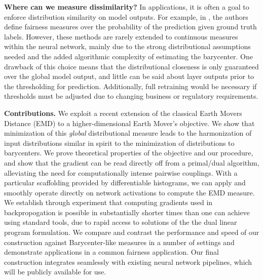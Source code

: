 \noindent\textbf{Where can we measure dissimilarity?}
In applications, it is often a goal to enforce distribution similarity on model outputs. For example, in \cite{jiang2020wasserstein}, the authors define fairness measures over the probability of the prediction given ground truth labels.   
% 
However, these methods are rarely extended to continuous measures within the neural network, 
mainly due to the strong distributional assumptions needed and the added algorithmic complexity of estimating the barycenter.
One drawback of this choice means that the distributional closeness is only guaranteed over the global model output, and little can be said about layer outputs prior to the thresholding for prediction.
Additionally, full retraining would be necessary if thresholds must be adjusted due to changing business or regulatory requirements.

\noindent\textbf{Contributions.} We exploit a recent extension of the classical Earth Movers Distance (EMD) to a higher-dimensional Earth Mover's objective.
We show that minimization of this \textit{global} distributional measure leads to the 
harmonization of input distributions similar in spirit to the minimization of distributions to barycenters.
We prove theoretical properties of the objective and our procedure, and show that 
the gradient can be read directly off from a primal/dual algorithm,
alleviating the need for computationally intense pairwise couplings.
With a particular scaffolding provided by differentiable histograms, we can apply and smoothly operate directly on network activations to compute the EMD measure. 
We establish through experiment that computing gradients used in backpropogation is possible in substantially shorter times than one can achieve using standard tools, due to rapid access to solutions of the the dual linear program formulation.
We compare and contrast the performance and speed of our construction against Barycenter-like measures in a number of settings and demonstrate applications in a common fairness application.
Our final construction integrates seamlessly with existing neural network pipelines, 
which will be publicly available for use.


